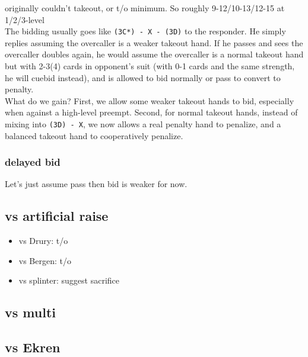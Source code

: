 {\small\ttfamily*originally couldn't takeout, or t/o minimum. So roughly 9-12/10-13/12-15 at 1/2/3-level} \\

The bidding usually goes like \texttt{(3C*) - X - (3D)} to the responder.
He simply replies assuming the overcaller is a weaker takeout hand.
If he passes and sees the overcaller doubles again, he would assume the overcaller is a normal takeout hand but with 2-3(4) cards in opponent's suit
(with 0-1 cards and the same strength, he will cuebid instead), and is allowed to bid normally or pass to convert to penalty. \\
What do we gain? First, we allow some weaker takeout hands to bid, especially when against a high-level preempt.
Second, for normal takeout hands, instead of mixing into \texttt{(3D) - X}, we now allows a real penalty hand to penalize, and a balanced takeout hand to cooperatively penalize.

\subsubsection{delayed bid}

Let's just assume pass then bid is weaker for now.

\subsection{vs artificial raise}

\begin{itemize}
    \setlength{\itemsep}{0pt}
    \item vs Drury: t/o
    \item vs Bergen: t/o
    \item vs splinter: suggest sacrifice
\end{itemize}

\subsection{vs multi}



\subsection{vs Ekren}


